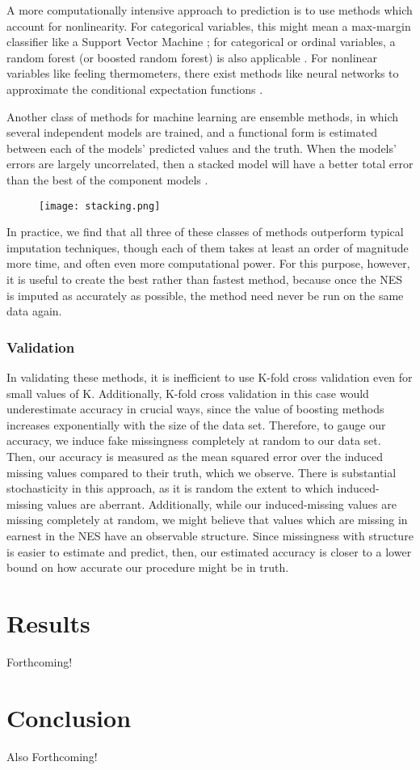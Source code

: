 \documentclass{article}
\begin{document}
A more computationally intensive approach to prediction is to use methods which account for nonlinearity. For categorical variables, this might mean a max-margin classifier like a Support Vector Machine \citep{hearst1998support}; for categorical or ordinal variables, a random forest (or boosted random forest) is also applicable \citep{liaw2002classification}. For nonlinear variables like feeling thermometers, there exist methods like neural networks to approximate the conditional expectation functions \citep{specht1991general}.

Another class of methods for machine learning are ensemble methods, in which several independent models are trained, and a functional form is estimated between each of the models' predicted values and the truth. When the models' errors are largely uncorrelated, then a stacked model will have a better total error than the best of the component models \citep{dvzeroski2004combining}.

\begin{figure}[H]
\centering
\texttt{[image: stacking.png]}
\end{figure}

In practice, we find that all three of these classes of methods outperform typical imputation techniques, though each of them takes at least an order of magnitude more time, and often even more computational power. For this purpose, however, it is useful to create the best rather than fastest method, because once the NES is imputed as accurately as possible, the method need never be run on the same data again.

\subsubsection{Validation}
\label{sec:valid}

In validating these methods, it is inefficient to use K-fold cross validation even for small values of K. Additionally, K-fold cross validation in this case would underestimate accuracy in crucial ways, since the value of boosting methods increases exponentially with the size of the data set. Therefore, to gauge our accuracy, we induce fake missingness completely at random to our data set. Then, our accuracy is measured as the mean squared error over the induced missing values compared to their truth, which we observe. There is substantial stochasticity in this approach, as it is random the extent to which induced-missing values are aberrant. Additionally, while our induced-missing values are missing completely at random, we might believe that values which are missing in earnest in the NES have an observable structure. Since missingness with structure is easier to estimate and predict, then, our estimated accuracy is closer to a lower bound on how accurate our procedure might be in truth.

\section{Results}
\label{sec:results}

Forthcoming!

\section{Conclusion}
\label{sec:conclusion}

Also Forthcoming!

\newpage


\end{document}
